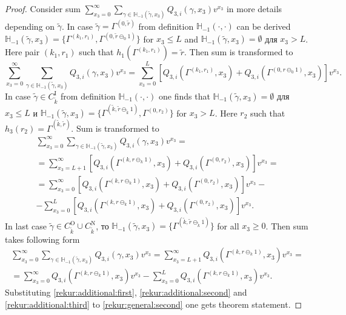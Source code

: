 \documentclass[runningheads,a4paper]{llncs}
\begin{document}
\begin{proof}
Consider sum $\sum_{x_3=0}^{\infty} \sum_{\gamma \in {\mathbb H}_{-1}(\tilde{\gamma},x_3)} Q_{3,i}(\gamma,x_3) v^{x_3}$ in more details depending on $\tilde{\gamma}$.
In case $\tilde{\gamma} = \Gamma^{(0,\tilde{r})}$ from definition  ${\mathbb H}_{-1}(\cdot,\cdot)$ can be derived ${\mathbb H}_{-1}(\tilde{\gamma},x_3) = \{\Gamma^{(k_1,r_1)}, \Gamma^{(0,\tilde{r}\ominus_0 1)}\}$ for $x_3 \leqslant L$ and ${\mathbb H}_{-1}(\tilde{\gamma},x_3) =\emptyset$ для $x_3 > L$. Here pair $(k_1,r_1)$ such that $h_1(\Gamma^{(k_1,r_1)}) = \tilde{r}$. Then sum is transformed to
\begin{equation}
\sum_{x_3=0}^{\infty} \sum_{\gamma \in {\mathbb H}_{-1}(\tilde{\gamma},x_3)} Q_{3,i}(\gamma,x_3) v^{x_3} = \sum_{x_3=0}^{L} \left[ Q_{3,i}(\Gamma^{(k_1,r_1)},x_3) + Q_{3,i}(\Gamma^{(0,r\ominus_0 1)},x_3) \right] v^{x_3}.
\label{rekur:additional:first}
\end{equation}
In case $\tilde{\gamma} \in C_{\tilde{k}}^{\mathrm{I}}$ from definition  ${\mathbb H}_{-1}(\cdot,\cdot)$ one finds that ${\mathbb H}_{-1}(\tilde{\gamma},x_3) = \emptyset$ для $x_3 \leqslant L$ и ${\mathbb H}_{-1}(\tilde{\gamma},x_3) = \{\Gamma^{(\tilde{k},\tilde{r}\ominus_{\tilde{k}} 1)}, \Gamma^{(0,r_2)}\}$ for $x_3 > L$. Here $r_2$ such that $h_3(r_2)=\Gamma^{(\tilde{k},\tilde{r})}$. Sum is transformed to
\begin{multline}
\sum_{x_3=0}^{\infty} \sum_{\gamma \in {\mathbb H}_{-1}(\tilde{\gamma},x_3)} Q_{3,i}(\gamma,x_3) v^{x_3} = \\
=\sum_{x_3=L+1}^{\infty} \left[ Q_{3,i}(\Gamma^{(k,r\ominus_k 1)},x_3) + Q_{3,i}(\Gamma^{(0,r_2)},x_3) \right] v^{x_3} = \\=
\sum_{x_3=0}^{\infty} \left[ Q_{3,i}(\Gamma^{(k,r\ominus_k 1)},x_3) + Q_{3,i}(\Gamma^{(0,r_2)},x_3) \right] v^{x_3} -\\
-\sum_{x_3=0}^{L} \left[ Q_{3,i}(\Gamma^{(k,r\ominus_k 1)},x_3) + Q_{3,i}(\Gamma^{(0,r_2)},x_3) \right] v^{x_3}.
\label{rekur:additional:second}
\end{multline}
In last case $\tilde{\gamma}\in C_{\tilde{k}}^{\mathrm{O}} \cup C_{\tilde{k}}^{\mathrm{N}}$, то ${\mathbb H}_{-1}(\tilde{\gamma},x_3) = \{\Gamma^{(\tilde{k},\tilde{r}\ominus_{\tilde{k}} 1)}\}$ for all $x_3\geqslant 0$. Then sum takes following form
\begin{multline}
\sum_{x_3=0}^{\infty} \sum_{\gamma \in {\mathbb H}_{-1}(\tilde{\gamma},x_3)} Q_{3,i}(\gamma,x_3) v^{x_3} = \sum_{x_3=L+1}^{\infty} Q_{3,i}(\Gamma^{(k,r\ominus_k 1)},x_3) v^{x_3} =\\=
\sum_{x_3=0}^{\infty} Q_{3,i}(\Gamma^{(k,r\ominus_k 1)},x_3) v^{x_3} - \sum_{x_3=0}^{L} Q_{3,i}(\Gamma^{(k,r\ominus_k 1)},x_3) v^{x_3}.
\label{rekur:additional:third}
\end{multline}
Substituting \eqref{rekur:additional:first}, \eqref{rekur:additional:second} and \eqref{rekur:additional:third} to \eqref{rekur:general:second} one gets theorem statement.
\end{proof}
\end{document}
